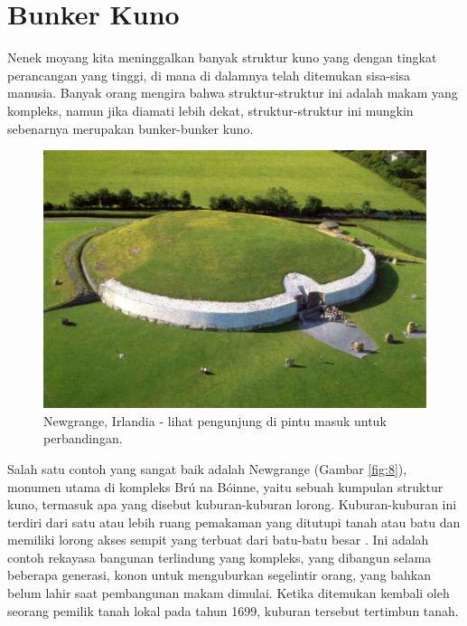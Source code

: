 \documentclass[10pt,twocolumn,letterpaper]{article}
\begin{document}
\section{Bunker Kuno}

Nenek moyang kita meninggalkan banyak struktur kuno yang dengan tingkat perancangan yang tinggi, di mana di dalamnya telah ditemukan sisa-sisa manusia. Banyak orang mengira bahwa struktur-struktur ini adalah makam yang kompleks, namun jika diamati lebih dekat, struktur-struktur ini mungkin sebenarnya merupakan bunker-bunker kuno.

\begin{figure}[b]
\begin{center}
   \includegraphics[width=1\linewidth]{ww19.jpg}
\end{center}
   \caption{Newgrange, Irlandia - lihat pengunjung di pintu masuk untuk perbandingan.}
\label{fig:8}
\label{fig:onecol}
\end{figure}

Salah satu contoh yang sangat baik adalah Newgrange (Gambar \ref{fig:8}), monumen utama di kompleks Brú na Bóinne, yaitu sebuah kumpulan struktur kuno, termasuk apa yang disebut kuburan-kuburan lorong. Kuburan-kuburan ini terdiri dari satu atau lebih ruang pemakaman yang ditutupi tanah atau batu dan memiliki lorong akses sempit yang terbuat dari batu-batu besar \cite{70}. Ini adalah contoh rekayasa bangunan terlindung yang kompleks, yang dibangun selama beberapa generasi, konon untuk menguburkan segelintir orang, yang bahkan belum lahir saat pembangunan makam dimulai. Ketika ditemukan kembali oleh seorang pemilik tanah lokal pada tahun 1699, kuburan tersebut tertimbun tanah.
\end{document}
